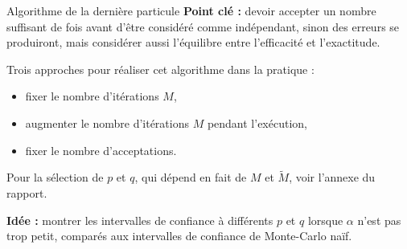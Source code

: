 \documentclass{beamer}
\begin{document}
\begin{frame}{Algorithme de la dernière particule}
    \textbf{Point clé :} devoir accepter un nombre suffisant de fois avant d'être considéré comme indépendant, sinon des erreurs se produiront, mais considérer aussi l'équilibre entre l'efficacité et l'exactitude. \pause

    Trois approches pour réaliser cet algorithme dans la pratique :
    \begin{itemize}
        \item fixer le nombre d'itérations $M$,
        \item augmenter le nombre d'itérations $M$ pendant l'exécution,
        \item fixer le nombre d'acceptations.
    \end{itemize} \pause

    Pour la sélection de $p$ et $q$, qui dépend en fait de $M$ et $\tilde M$, voir l'annexe du rapport.

    \textbf{Idée :} montrer les intervalles de confiance à différents $p$ et $q$ lorsque $\alpha$ n'est pas trop petit, comparés aux intervalles de confiance de Monte-Carlo naïf.
\end{frame}
\end{document}
